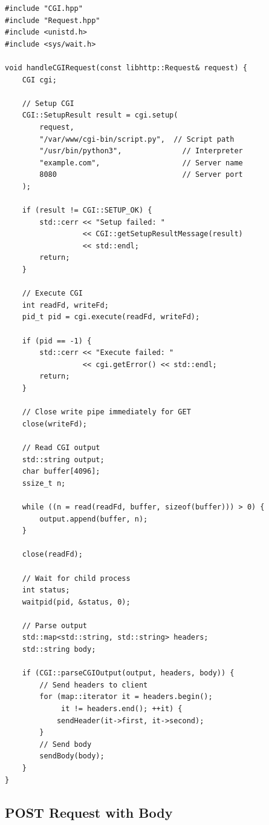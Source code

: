 \documentclass[11pt,a4paper]{article}
\begin{document}
\begin{lstlisting}[caption=Simple GET Request Handler]
#include "CGI.hpp"
#include "Request.hpp"
#include <unistd.h>
#include <sys/wait.h>

void handleCGIRequest(const libhttp::Request& request) {
    CGI cgi;
    
    // Setup CGI
    CGI::SetupResult result = cgi.setup(
        request,
        "/var/www/cgi-bin/script.py",  // Script path
        "/usr/bin/python3",              // Interpreter
        "example.com",                   // Server name
        8080                             // Server port
    );
    
    if (result != CGI::SETUP_OK) {
        std::cerr << "Setup failed: "
                  << CGI::getSetupResultMessage(result)
                  << std::endl;
        return;
    }
    
    // Execute CGI
    int readFd, writeFd;
    pid_t pid = cgi.execute(readFd, writeFd);
    
    if (pid == -1) {
        std::cerr << "Execute failed: "
                  << cgi.getError() << std::endl;
        return;
    }
    
    // Close write pipe immediately for GET
    close(writeFd);
    
    // Read CGI output
    std::string output;
    char buffer[4096];
    ssize_t n;
    
    while ((n = read(readFd, buffer, sizeof(buffer))) > 0) {
        output.append(buffer, n);
    }
    
    close(readFd);
    
    // Wait for child process
    int status;
    waitpid(pid, &status, 0);
    
    // Parse output
    std::map<std::string, std::string> headers;
    std::string body;
    
    if (CGI::parseCGIOutput(output, headers, body)) {
        // Send headers to client
        for (map::iterator it = headers.begin();
             it != headers.end(); ++it) {
            sendHeader(it->first, it->second);
        }
        // Send body
        sendBody(body);
    }
}
\end{lstlisting}

\subsection{POST Request with Body}
\end{document}
